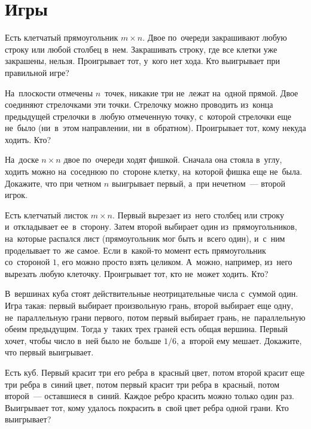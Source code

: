 
\section*{Игры}


\begin{problems}

\item
Есть клетчатый прямоугольник $m \times n$.
Двое по~очереди закрашивают любую строку или любой столбец в~нем.
Закрашивать строку, где все клетки уже закрашены, нельзя.
Проигрывает тот, у~кого нет хода.
Кто выигрывает при правильной игре?

\item
На~плоскости отмечены $n$~точек, никакие три не~лежат на~одной прямой.
Двое соединяют стрелочками эти точки.
Стрелочку можно проводить из~конца предыдущей стрелочки в~любую отмеченную
точку, с~которой стрелочки еще не~было (ни~в~этом направлении, ни~в~обратном).
Проигрывает тот, кому некуда ходить.
Кто?

\item
На~доске $n \times n$ двое по~очереди ходят фишкой.
Сначала она стояла в~углу, ходить можно на~соседнюю по~стороне клетку,
на~которой фишка еще не~была.
Докажите, что при четном $n$ выигрывает первый, а~при нечетном~--- второй
игрок.

\item
Есть клетчатый листок $m \times n$.
Первый вырезает из~него столбец или строку и~откладывает ее~в~сторону.
Затем второй выбирает один из~прямоугольников, на~которые распался лист
(прямоугольник мог быть и~всего один), и~с~ним проделывает то~же самое.
Если в~какой-то момент есть прямоугольник со~стороной $1$, его можно просто
взять целиком.
А~можно, например, из~него вырезать любую клеточку.
Проигрывает тот, кто не~может ходить.
Кто?

\item
В~вершинах куба стоят действительные неотрицательные числа с~суммой один.
Игра такая: первый выбирает произвольную грань, второй выбирает еще одну,
не~параллельную грани первого, потом первый выбирает грань, не~параллельную
обеим предыдущим.
Тогда у~таких трех граней есть общая вершина.
Первый хочет, чтобы число в~ней было не~больше $1/6$, а~второй ему мешает.
Докажите, что первый выигрывает.

\item
Есть куб.
Первый красит три его ребра в~красный цвет, потом второй красит еще три ребра
в~синий цвет, потом первый красит три ребра в~красный, потом второй~---
оставшиеся в~синий.
Каждое ребро красить можно только один раз.
Выигрывает тот, кому удалось покрасить в~свой цвет ребра одной грани.
Кто выигрывает?


\end{problems}
